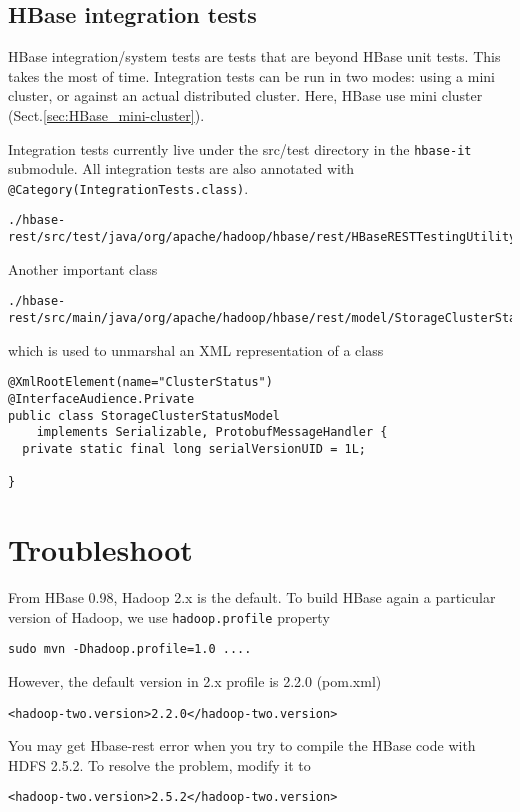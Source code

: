 \subsection{HBase integration tests}
\label{sec:HBase_integration_test}

HBase integration/system tests are tests that are beyond HBase unit tests. This
takes the most of time.
Integration tests can be run in two modes: using a mini cluster, or against an
actual distributed cluster. Here, HBase use mini cluster
(Sect.\ref{sec:HBase_mini-cluster}).


Integration tests currently live under the src/test directory in the \verb!hbase-it! submodule.
All integration tests are also annotated with
\verb!@Category(IntegrationTests.class)!.


\begin{verbatim}
./hbase-rest/src/test/java/org/apache/hadoop/hbase/rest/HBaseRESTTestingUtility.java
\end{verbatim}

Another important class
\begin{verbatim}
./hbase-rest/src/main/java/org/apache/hadoop/hbase/rest/model/StorageClusterStatusModel.java
\end{verbatim}
which is used to unmarshal an XML representation of a class
\begin{verbatim}
@XmlRootElement(name="ClusterStatus")
@InterfaceAudience.Private
public class StorageClusterStatusModel 
    implements Serializable, ProtobufMessageHandler {
  private static final long serialVersionUID = 1L;

}
\end{verbatim}

\section{Troubleshoot}
\label{sec:troubleshoot_build}

From HBase 0.98, Hadoop 2.x is the default. To build HBase again a particular
version of Hadoop, we use \verb!hadoop.profile! property
\begin{verbatim} 
sudo mvn -Dhadoop.profile=1.0 ....
\end{verbatim}
However, the default version in 2.x profile is 2.2.0 (pom.xml)
\begin{verbatim}
<hadoop-two.version>2.2.0</hadoop-two.version>
\end{verbatim}
You may get Hbase-rest error when you try to compile the HBase code with HDFS
2.5.2. To resolve the problem, modify it to 
\begin{verbatim}
<hadoop-two.version>2.5.2</hadoop-two.version>
\end{verbatim}

